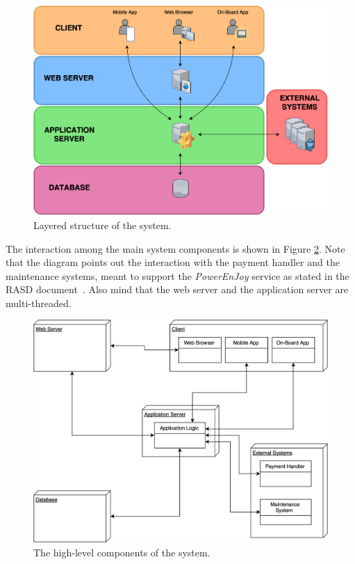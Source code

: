 \begin{figure}[H]
\begin{center}
		\includegraphics[width=\textwidth]{./arch_design/diagrams/system_layers.png}
		\caption{Layered structure of the system.}
		\label{sys_layers}
\end{center}
\end{figure}

The interaction among the main system components is shown in Figure \ref{sys_comps}. Note that the diagram points out the interaction with the payment handler and the maintenance systems, meant to support the \emph{PowerEnJoy} service as stated in the RASD document~\cite{rasd}. Also mind that the web server and the application server are multi-threaded.

\begin{figure}[H]
\begin{center}
		\includegraphics[width=\textwidth]{./arch_design/diagrams/system_components.png}
		\caption{The high-level components of the system.}
		\label{sys_comps}
\end{center}
\end{figure}